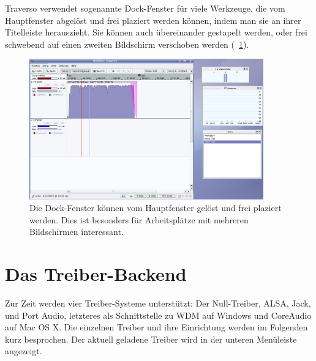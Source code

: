 Traverso verwendet sogenannte Dock-Fenster für viele Werkzeuge, die vom Hauptfenster abgelöst und frei plaziert werden können, indem man sie an ihrer Titelleiste herauszieht. Sie können auch übereinander gestapelt werden, oder frei schwebend auf einen zweiten Bildschirm verschoben werden (\FigB\ \ref{fig_mainwin02}).

\begin{figure}
 \centering\includegraphics[width=0.9\textwidth]{images/sshot03.png}
 \caption{Die Dock-Fenster können vom Hauptfenster gelöst und frei plaziert werden. Dies ist besonders für Arbeitsplätze mit mehreren Bildschirmen interessant.}
 \label{fig_mainwin02}
\end{figure}

\section{Das Treiber-Backend}
Zur Zeit werden vier Treiber-Systeme unterstützt: Der Null-Treiber, ALSA, Jack, und Port Audio, letzteres als Schnittstelle zu WDM auf Windows und CoreAudio auf Mac OS X. Die einzelnen Treiber und ihre Einrichtung werden im Folgenden kurz besprochen. Der aktuell geladene Treiber wird in der unteren Menüleiste angezeigt.

